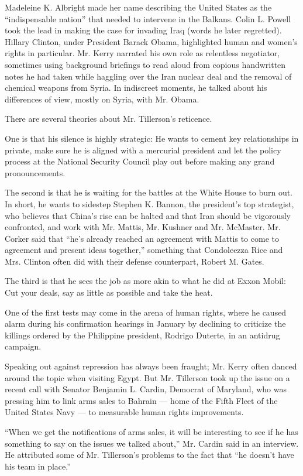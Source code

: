 Madeleine K. Albright made her name describing the United States as the
``indispensable nation'' that needed to intervene in the Balkans. Colin
L. Powell took the lead in making the case for invading Iraq (words he
later regretted). Hillary Clinton, under President Barack Obama,
highlighted human and women's rights in particular. Mr. Kerry narrated
his own role as relentless negotiator, sometimes using background
briefings to read aloud from copious handwritten notes he had taken
while haggling over the Iran nuclear deal and the removal of chemical
weapons from Syria. In indiscreet moments, he talked about his
differences of view, mostly on Syria, with Mr. Obama.

There are several theories about Mr. Tillerson's reticence.

One is that his silence is highly strategic: He wants to cement key
relationships in private, make sure he is aligned with a mercurial
president and let the policy process at the National Security Council
play out before making any grand pronouncements.

The second is that he is waiting for the battles at the White House to
burn out. In short, he wants to sidestep Stephen K. Bannon, the
president's top strategist, who believes that China's rise can be halted
and that Iran should be vigorously confronted, and work with Mr. Mattis,
Mr. Kushner and Mr. McMaster. Mr. Corker said that ``he's already
reached an agreement with Mattis to come to agreement and present ideas
together,'' something that Condoleezza Rice and Mrs. Clinton often did
with their defense counterpart, Robert M. Gates.

The third is that he sees the job as more akin to what he did at Exxon
Mobil: Cut your deals, say as little as possible and take the heat.

One of the first tests may come in the arena of human rights, where he
caused alarm during his confirmation hearings in January by declining to
criticize the killings ordered by the Philippine president, Rodrigo
Duterte, in an antidrug campaign.

Speaking out against repression has always been fraught; Mr. Kerry often
danced around the topic when visiting Egypt. But Mr. Tillerson took up
the issue on a recent call with Senator Benjamin L. Cardin, Democrat of
Maryland, who was pressing him to link arms sales to Bahrain --- home of
the Fifth Fleet of the United States Navy --- to measurable human rights
improvements.

``When we get the notifications of arms sales, it will be interesting to
see if he has something to say on the issues we talked about,'' Mr.
Cardin said in an interview. He attributed some of Mr. Tillerson's
problems to the fact that ``he doesn't have his team in place.''

